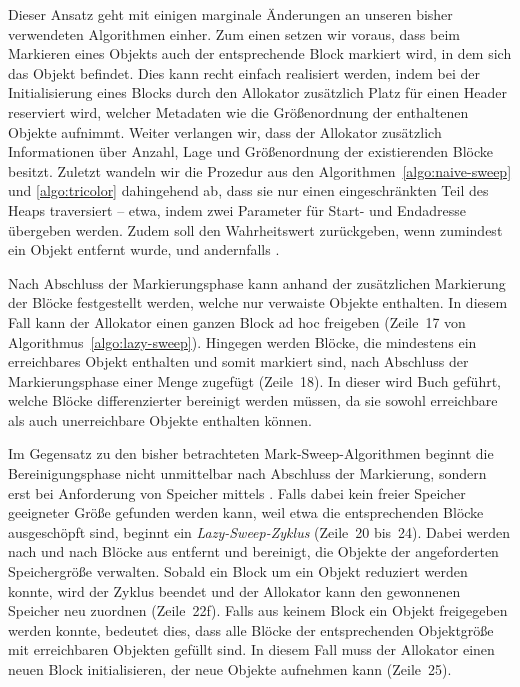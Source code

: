 Dieser Ansatz geht mit einigen marginale Änderungen an unseren bisher verwendeten Algorithmen einher.
Zum einen setzen wir voraus, dass beim Markieren eines Objekts auch der entsprechende Block markiert wird, in dem sich das Objekt befindet.
Dies kann recht einfach realisiert werden, indem bei der Initialisierung eines Blocks durch den Allokator zusätzlich Platz für einen Header reserviert wird, welcher Metadaten wie die Größenordnung der enthaltenen Objekte aufnimmt.
Weiter verlangen wir, dass der Allokator zusätzlich Informationen über Anzahl, Lage und Größenordnung der existierenden Blöcke besitzt.
Zuletzt wandeln wir die Prozedur  aus den Algorithmen~\ref{algo:naive-sweep} und \ref{algo:tricolor} dahingehend ab, dass sie nur einen eingeschränkten Teil des Heaps traversiert -- etwa, indem zwei Parameter für Start- und Endadresse übergeben werden.
Zudem soll  den Wahrheitswert  zurückgeben, wenn zumindest ein Objekt entfernt wurde, und andernfalls .

Nach Abschluss der Markierungsphase kann anhand der zusätzlichen Markierung der Blöcke festgestellt werden, welche nur verwaiste Objekte enthalten.
In diesem Fall kann der Allokator einen ganzen Block ad hoc freigeben (Zeile~17 von Algorithmus~\ref{algo:lazy-sweep}).
Hingegen werden Blöcke, die mindestens ein erreichbares Objekt enthalten und somit markiert sind, nach Abschluss der Markierungsphase einer Menge  zugefügt (Zeile~18).
In dieser wird Buch geführt, welche Blöcke differenzierter bereinigt werden müssen, da sie sowohl erreichbare als auch unerreichbare Objekte enthalten können.

Im Gegensatz zu den bisher betrachteten Mark-Sweep-Algorithmen beginnt die Bereinigungsphase nicht unmittelbar nach Abschluss der Markierung, sondern erst bei Anforderung von Speicher mittels .
Falls dabei kein freier Speicher geeigneter Größe gefunden werden kann, weil etwa die entsprechenden Blöcke ausgeschöpft sind, beginnt ein \textit{Lazy-Sweep-Zyklus} (Zeile~20 bis~24).
Dabei werden nach und nach Blöcke aus  entfernt und bereinigt, die Objekte der angeforderten Speichergröße verwalten.
Sobald ein Block um ein Objekt reduziert werden konnte, wird der Zyklus beendet und der Allokator kann den gewonnenen Speicher neu zuordnen (Zeile~22f).
Falls aus keinem Block ein Objekt freigegeben werden konnte, bedeutet dies, dass alle Blöcke der entsprechenden Objektgröße mit erreichbaren Objekten gefüllt sind.
In diesem Fall muss der Allokator einen neuen Block initialisieren, der neue Objekte aufnehmen kann (Zeile~25).

